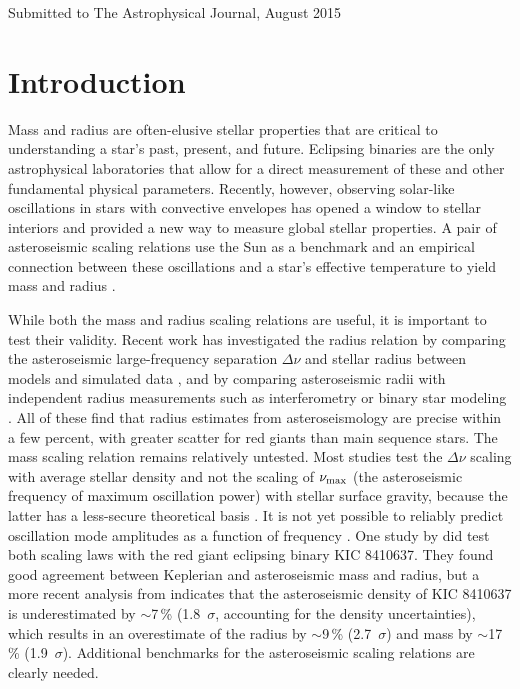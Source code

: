 Submitted to The Astrophysical Journal, August 2015


\section{Introduction}\label{intro}


Mass and radius are often-elusive stellar properties that are critical to understanding a star's past, present, and future. Eclipsing binaries are the only astrophysical laboratories that allow for a direct measurement of these and other fundamental physical parameters. Recently, however, observing solar-like oscillations in stars with convective envelopes has opened a window to stellar interiors and provided a new way to measure global stellar properties. A pair of asteroseismic scaling relations use the Sun as a benchmark and an empirical connection between these oscillations and a star's effective temperature to yield mass and radius \citep{kje95,hub10,mos13}.

While both the mass and radius scaling relations are useful, it is important to test their validity. Recent work has investigated the radius relation by comparing the asteroseismic large-frequency separation $\Delta \nu$ and stellar radius between models and simulated data \citep[e.g.][]{ste09,whi11,mig13}, and by comparing asteroseismic radii with independent radius measurements such as interferometry or binary star modeling \citep[e.g.][]{hub11,hub12,sil12}. All of these find that radius estimates from asteroseismology are precise within a few percent, with greater scatter for red giants than main sequence stars. The mass scaling relation remains relatively untested. Most studies test the $\Delta\nu$ scaling with average stellar density and not the scaling of $\nu_{\rm{max}}$ (the asteroseismic frequency of maximum oscillation power) with stellar surface gravity, because the latter has a less-secure theoretical basis . It is not yet possible to reliably predict oscillation mode amplitudes as a function of frequency \citep{chr12}. One study by \citet{fra13} did test both scaling laws with the red giant eclipsing binary KIC 8410637. They found good agreement between Keplerian and asteroseismic mass and radius, but a more recent analysis from \citet{hub14} indicates that the asteroseismic density of KIC 8410637 is underestimated by $\sim$7\,\% (1.8~$\sigma$, accounting for the density uncertainties), which results in an overestimate of the radius by $\sim$9\,\% (2.7~$\sigma$) and mass by $\sim$17\,\% (1.9~$\sigma$). Additional benchmarks for the asteroseismic scaling relations are clearly needed.

